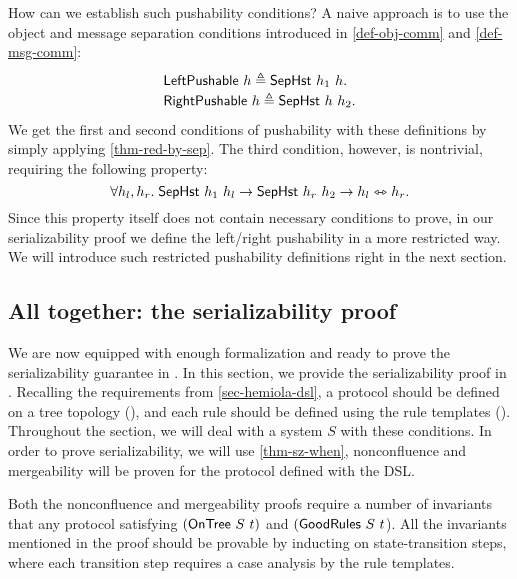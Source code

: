 How can we establish such pushability conditions?
A naive approach is to use the object and message separation conditions introduced in \autoref{def-obj-comm} and \autoref{def-msg-comm}:
\begin{displaymath}
  \renewcommand{\arraystretch}{1.2}
  \begin{array}{l}
    \mathsf{LeftPushable}\ h \triangleq \stseph{h_1}{h}.\\
    \mathsf{RightPushable}\ h \triangleq \stseph{h}{h_2}.
  \end{array}
\end{displaymath}
We get the first and second conditions of pushability with these definitions by simply applying \autoref{thm-red-by-sep}.
The third condition, however, is nontrivial, requiring the following property:
\begin{displaymath}
  \forall h_l, h_r.\; \mathsf{SepHst}\ h_1\ h_l \to \mathsf{SepHst}\ h_r\ h_2 \to h_l \leftrightarrowtriangle h_r.
\end{displaymath}
Since this property itself does not contain necessary conditions to prove, in our serializability proof we define the left/right pushability in a more restricted way.
We will introduce such restricted pushability definitions right in the next section.

\subsection{All together: the serializability proof}
\label{sec-sz-proof-all}

We are now equipped with enough formalization and ready to prove the serializability guarantee in \hemiola{}.
In this section, we provide the serializability proof in \hemiola{}.
Recalling the requirements from \autoref{sec-hemiola-dsl}, a protocol should be defined on a tree topology (), and each rule should be defined using the rule templates ().
Throughout the section, we will deal with a system $S$ with these conditions.
In order to prove serializability, we will use \autoref{thm-sz-when}, \ie{} nonconfluence and mergeability will be proven for the protocol defined with the \hemiola{} DSL.

Both the nonconfluence and mergeability proofs require a number of invariants that any protocol satisfying $(\mathsf{OnTree}\ S\ t)$ and $(\mathsf{GoodRules}\ S\ t$).
All the invariants mentioned in the proof should be provable by inducting on state-transition steps, where each transition step requires a case analysis by the rule templates.


